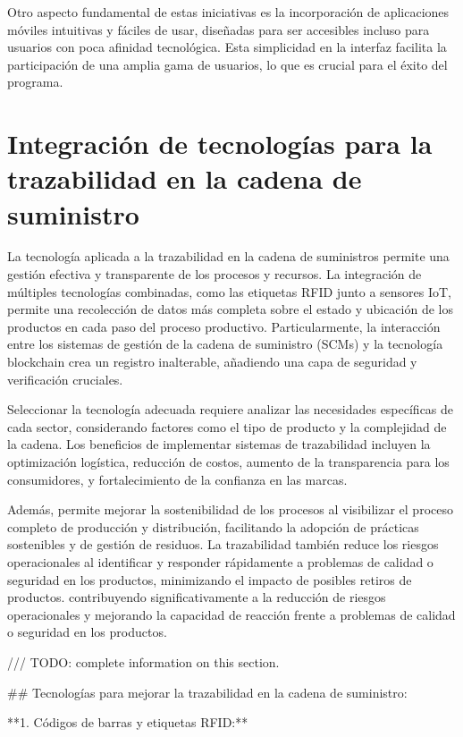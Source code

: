 \documentclass[main.tex]{subfiles}
\begin{document}
Otro aspecto fundamental de estas iniciativas es la incorporación de aplicaciones móviles intuitivas y fáciles de usar, diseñadas para ser accesibles incluso para usuarios con poca afinidad tecnológica. Esta simplicidad en la interfaz facilita la participación de una amplia gama de usuarios, lo que es crucial para el éxito del programa.

\section{Integración de tecnologías para la trazabilidad en la cadena de suministro}

La tecnología aplicada a la trazabilidad en la cadena de suministros permite una gestión efectiva y transparente de los procesos y recursos. La integración de múltiples tecnologías combinadas, como las etiquetas RFID junto a sensores IoT, permite una recolección de datos más completa sobre el estado y ubicación de los productos en cada paso del proceso productivo. Particularmente, la interacción entre los sistemas de gestión de la cadena de suministro (SCMs) y la tecnología blockchain crea un registro inalterable, añadiendo una capa de seguridad y verificación cruciales.

Seleccionar la tecnología adecuada requiere analizar las necesidades específicas de cada sector, considerando factores como el tipo de producto y la complejidad de la cadena. Los beneficios de implementar sistemas de trazabilidad incluyen la optimización logística, reducción de costos, aumento de la transparencia para los consumidores, y fortalecimiento de la confianza en las marcas.

Además, permite mejorar la sostenibilidad de los procesos al visibilizar el proceso completo de producción y distribución, facilitando la adopción de prácticas sostenibles y de gestión de residuos. La trazabilidad también reduce los riesgos operacionales al identificar y responder rápidamente a problemas de calidad o seguridad en los productos, minimizando el impacto de posibles retiros de productos. contribuyendo significativamente a la reducción de riesgos operacionales y mejorando la capacidad de reacción frente a problemas de calidad o seguridad en los productos.

/// TODO: complete information on this section.

## Tecnologías para mejorar la trazabilidad en la cadena de suministro:

**1. Códigos de barras y etiquetas RFID:**
\end{document}
